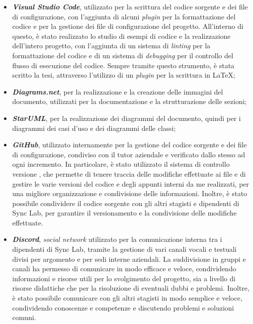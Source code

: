 \begin{itemize}
    \item{\textit{\textbf{Visual Studio Code}}},  utilizzato per la scrittura del codice sorgente e dei file di configurazione, con l'aggiunta di alcuni \textit{plugin} per la formattazione del codice e per la gestione dei file di configurazione 
    del progetto. All'interno di questo, è stato realizzato lo studio di esempi di codice e la realizzazione dell'intero progetto, con l'aggiunta di un sistema di \textit{linting} per la formattazione del codice e di un sistema di \textit{debugging} per il controllo del flusso di esecuzione del codice.
    Sempre tramite questo strumento, è stata scritto la tesi, attraverso l'utilizzo di un \textit{plugin} per la scrittura in \LaTeX;\@
    
    \item{\textit{\textbf{Diagrams.net}}}, per la realizzazione e la creazione delle immagini del documento, utilizzati per la documentazione e la strutturazione delle sezioni;
    
    \item{\textit{\textbf{StarUML}}}, per la realizzazione dei diagrammi  del documento, quindi per i diagrammi dei casi d'uso e dei diagrammi delle classi;

    \item{\textit{\textbf{GitHub}}}, utilizzato internamente per la gestione del codice sorgente e dei file di configurazione, condiviso con il tutor aziendale e verificato dallo stesso ad ogni incremento.
    In particolare, è stato utilizzato il sistema di controllo versione , che permette di tenere traccia delle modifiche effettuate ai file e di gestire le varie versioni del codice e degli appunti interni 
    da me realizzati, per una migliore organizzazione e condivisione delle informazioni. Inoltre, è stato possibile condividere il codice sorgente con gli altri stagisti e dipendenti di Sync Lab,
    per garantire il versionamento e la condivisione delle modifiche effettuate.
    
    \item{\textit{\textbf{Discord}}}, \textit{social network} utilizzato per la comunicazione interna tra i dipendenti di Sync Lab, 
    tramite la gestione di vari canali vocali e testuali divisi per argomento e per sedi interne aziendali. La suddivisione in gruppi e canali
    ha permesso di comunicare in modo efficace e veloce, condividendo informazioni e risorse utili per lo svolgimento del progetto, sia a livello di risorse 
    didattiche che per la risoluzione di eventuali dubbi e problemi. Inoltre, è stato possibile comunicare con gli altri stagisti in modo semplice e veloce,
    condividendo conoscenze e competenze e discutendo problemi e soluzioni comuni.
\end{itemize}


